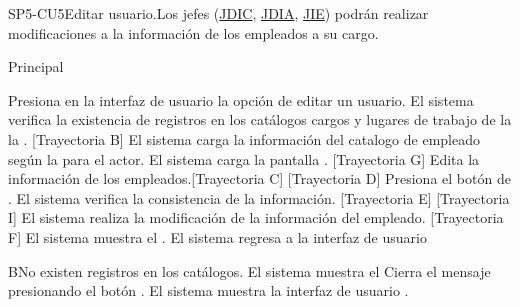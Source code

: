 \begin{UseCase}{SP5-CU5}{Editar usuario.}{Los jefes (\hyperlink{JDIC}{JDIC}, \hyperlink{JDIA}{JDIA}, \hyperlink{JIE}{JIE}) podrán realizar modificaciones a la información de los empleados a su cargo.}
{\begin{itemize}
            \end{itemize}
        }

\end{UseCase}

\begin{UCtrayectoria}{Principal}
    
    \UCpaso[\UCactor] Presiona en la interfaz de usuario  la opción de editar un usuario. 
    \UCpaso  El sistema verifica la existencia de registros en los catálogos cargos  y  lugares de trabajo de la la  . [Trayectoria B] 
    \UCpaso El sistema carga la información del catalogo de empleado  según la  para el actor.
    \UCpaso El sistema carga la pantalla  . [Trayectoria G] 
    \UCpaso[\UCactor] Edita la información de los empleados.[Trayectoria C] [Trayectoria D]
    \UCpaso[\UCactor]  Presiona el botón de .
    \UCpaso El sistema verifica la consistencia de la información. [Trayectoria E] [Trayectoria I]
    \UCpaso El sistema realiza la modificación de la información del empleado. [Trayectoria F] 
    \UCpaso  El sistema muestra el .    
    \UCpaso El sistema regresa a la interfaz de usuario 
\end{UCtrayectoria}

\begin{UCtrayectoriaA}{B}{No existen registros en los catálogos.}
    \UCpaso     El sistema muestra el 
    \UCpaso[\UCactor] Cierra el mensaje presionando el botón .
    \UCpaso El sistema muestra la interfaz de usuario .
\end{UCtrayectoriaA}

